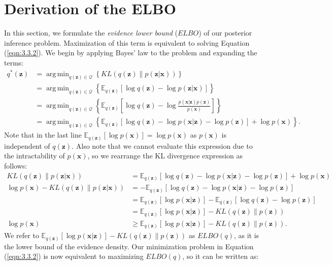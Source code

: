 \documentclass[honours,12pt, twoside]{unswthesis}
\DeclareMathOperator*{\argmin}{arg\,min}
\numberwithin{equation}{section}
\theoremstyle{definition}
\begin{document}
\section{Derivation of the ELBO}\label{sec:3.4}
In this section, we formulate the \textit{evidence lower bound} ($ELBO$) of our posterior inference problem. Maximization of this term is equivalent to solving Equation (\ref{eqn:3.3.2}). We begin by applying Bayes' law to the problem and expanding the terms:
\begin{align*}
q^*(\bm{z})&=\argmin_{q(\bm{z})\in \mathcal{Q}}\left\lbrace KL(q(\bm{z})\|p(\bm{z}|\bm{x}))\right\rbrace\\
&= \argmin_{q(\bm{z})\in \mathcal{Q}} \left\lbrace\mathbb{E}_{q(\bm{z})}[\log q(\bm{z})-\log p(\bm{z}|\bm{x})]\right\rbrace\\
&= \argmin_{q(\bm{z})\in \mathcal{Q}} \left\lbrace\mathbb{E}_{q(\bm{z})}\left[\log q(\bm{z})-\log\frac{p(\bm{x}|\bm{z})p(\bm{z})}{p(\bm{x})}\right]\right\rbrace\\
&= \argmin_{q(\bm{z})\in \mathcal{Q}} \left\lbrace\mathbb{E}_{q(\bm{z})}[\log q(\bm{z})-\log p(\bm{x}|\bm{z})-\log p(\bm{z})]+\log p(\bm{x})\right\rbrace.
\end{align*}
Note that in the last line $\mathbb{E}_{q(\bm{z})}[\log p(\bm{x})]=\log p(\bm{x})$ as $p(\bm{x})$ is independent of $q(\bm{z})$. Also note that we cannot evaluate this expression due to the intractability of $p(\bm{x})$, so we rearrange the KL divergence expression as follows:
\begin{align}
KL(q(\bm{z})\|p(\bm{z}|\bm{x}))&=\mathbb{E}_{q(\bm{z})}[\log q(\bm{z})-\log p(\bm{x}|\bm{z})-\log p(\bm{z})]+\log p(\bm{x}) \nonumber \\
\log p(\bm{x})-KL(q(\bm{z})\|p(\bm{z}|\bm{x}))&=-\mathbb{E}_{q(\bm{z})}[\log q(\bm{z})-\log p(\bm{x}|\bm{z})-\log p(\bm{z})]\nonumber \\
&=\mathbb{E}_{q(\bm{z})}[\log p(\bm{x}|\bm{z})]-\mathbb{E}_{q(\bm{z})}[\log q(\bm{z})-\log p(\bm{z})]\nonumber \\
&=\mathbb{E}_{q(\bm{z})}[\log p(\bm{x}|\bm{z})]-KL(q(\bm{z})\|p(\bm{z}))\nonumber\\
\log p(\bm{x})&\geq \mathbb{E}_{q(\bm{z})}[\log p(\bm{x}|\bm{z})]-KL(q(\bm{z})\|p(\bm{z})).
\end{align}
We refer to $\mathbb{E}_{q(\bm{z})}[\log p(\bm{x}|\bm{z})]-KL(q(\bm{z})\|p(\bm{z}))$ as $ELBO(q)$, as it is the lower bound of the evidence density. Our minimization problem in Equation (\ref{eqn:3.3.2}) is now equivalent to maximizing $ELBO(q)$, so it can be written as:
\end{document}

